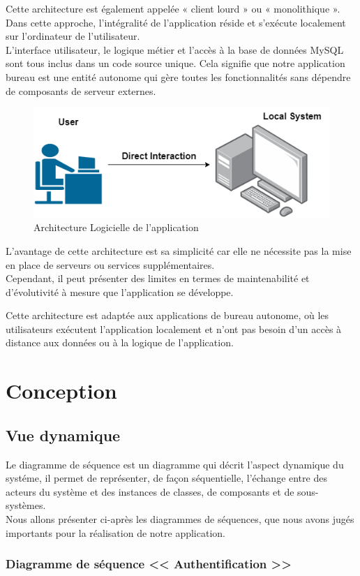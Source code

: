 \documentclass[12pt]{report}
\begin{document}
 Cette architecture est également appelée « client lourd » ou « monolithique ». Dans cette approche, l'intégralité de l'application réside et s'exécute localement sur l'ordinateur de l'utilisateur.\\  L'interface utilisateur, le logique métier et l'accès à la base de données MySQL sont tous inclus dans un code source unique. Cela signifie que notre application bureau est une entité autonome qui gère toutes les fonctionnalités sans dépendre de composants de serveur externes.
\begin{figure}[H]
  \centering
  \includegraphics[width=18.5cm]{1tier}
  \caption{Architecture Logicielle de l'application }
  \label{fig:votre-label}
\end{figure}
 L’avantage de cette architecture est sa simplicité car elle ne nécessite pas la mise en place de serveurs ou services supplémentaires. 
 \\
 Cependant, il peut présenter des limites en termes de maintenabilité et d’évolutivité à mesure que l’application se développe.
 
Cette architecture est adaptée aux applications de bureau autonome, où les utilisateurs exécutent l'application localement et n'ont pas besoin d'un accès à distance aux données ou à la logique de l'application.
\section{Conception}

\subsection{Vue dynamique}
Le diagramme de séquence est un diagramme qui décrit l'aspect dynamique du systéme, il permet de représenter, de façon séquentielle, l'échange entre des acteurs du système et des instances de classes, de composants et de sous-systèmes.
\\
Nous allons présenter ci-après les diagrammes de séquences, que nous avons jugés importants pour la réalisation de notre application.\subsubsection{Diagramme de séquence << Authentification >>}
\end{document}
